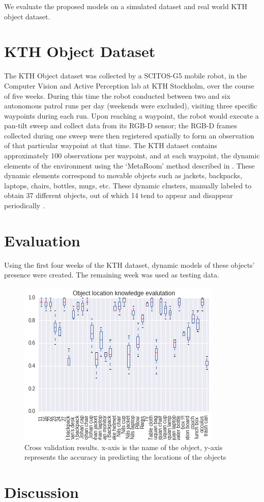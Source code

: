 We evaluate the proposed models on a simulated dataset and real world KTH object dataset.

\FloatBarrier
\section{KTH Object Dataset}

The KTH Object dataset was collected by a SCITOS-G5 mobile robot, in the Computer Vision and Active Perception lab at KTH Stockholm, over  the  course  of  five  weeks.  During  this  time  the  robot conducted  between  two  and  six  autonomous  patrol  runs per  day  (weekends  were  excluded),  visiting  three  specific waypoints  during  each  run.  Upon  reaching  a  waypoint,  the robot  would  execute  a  pan-tilt  sweep  and  collect  data  from its RGB-D sensor; the RGB-D frames collected during one sweep were then registered spatially to form an observation of  that  particular  waypoint  at  that  time.  The  KTH  dataset contains  approximately  100 observations  per  waypoint,  and at  each  waypoint, the  dynamic  elements  of the  environment  using  the  ‘MetaRoom’  method  described in \cite{ambrucs2014meta}. These  dynamic  elements  correspond  to  movable  objects such  as  jackets,  backpacks,  laptops,  chairs,  bottles,  mugs, etc. These dynamic clusters,  manually labeled  to obtain 37 different objects, out  of  which  14  tend  to  appear  and  disappear  periodically \cite{krajnik_wheres_2015}. 

\section{Evaluation}

Using the first four weeks of the KTH dataset, dynamic models  of  these  objects’ presence  were  created.  The  remaining week was used as testing data.

\begin{figure}[htp]
\centering
\includegraphics[width=\textwidth]{images/learning_evaluation.png}
\caption[Cross validation results]{Cross validation results. x-axis is the name of the object, y-axis represents the accuracy in predicting the locations of the objects }
\label{object_evaluation}
\end{figure}
\section{Discussion}
